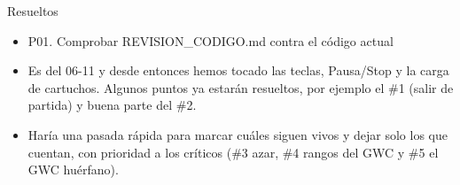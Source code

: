 Resueltos 
\begin{itemize}
	\item P01. Comprobar REVISION\_CODIGO.md contra el código actual 

	\item Es del 06-11 y desde entonces hemos tocado las teclas, Pausa/Stop y la carga de cartuchos. Algunos puntos ya estarán resueltos, por ejemplo el \#1 (salir de partida) y buena parte del \#2.
	
	\item Haría una pasada rápida para marcar cuáles siguen vivos y dejar solo los que cuentan, con prioridad a los críticos (\#3 azar, \#4 rangos del GWC y \#5 el GWC huérfano).
\end{itemize}